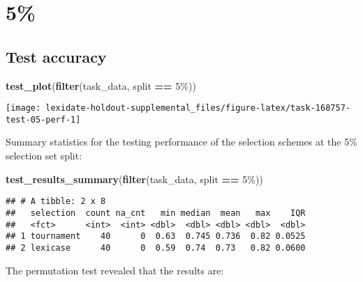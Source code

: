 \documentclass[
]{book}
\newenvironment{Shaded}{\begin{snugshade}}{\end{snugshade}}
\newcommand{\FunctionTok}[1]{\textcolor[rgb]{0.13,0.29,0.53}{\textbf{#1}}}
\newcommand{\NormalTok}[1]{#1}
\newcommand{\SpecialCharTok}[1]{\textcolor[rgb]{0.81,0.36,0.00}{\textbf{#1}}}
\newcommand{\StringTok}[1]{\textcolor[rgb]{0.31,0.60,0.02}{#1}}
\begin{document}
\hypertarget{section-20}{%
\section{5\%}\label{section-20}}

\hypertarget{test-accuracy-20}{%
\subsection{Test accuracy}\label{test-accuracy-20}}

\begin{Shaded}
\begin{Highlighting}[]
\FunctionTok{test\_plot}\NormalTok{(}\FunctionTok{filter}\NormalTok{(task\_data, split }\SpecialCharTok{==} \StringTok{\textquotesingle{}5\%\textquotesingle{}}\NormalTok{))}
\end{Highlighting}
\end{Shaded}

\texttt{[image: lexidate-holdout-supplemental\_files/figure-latex/task-168757-test-05-perf-1]}

Summary statistics for the testing performance of the selection schemes at the 5\% selection set split:

\begin{Shaded}
\begin{Highlighting}[]
\FunctionTok{test\_results\_summary}\NormalTok{(}\FunctionTok{filter}\NormalTok{(task\_data, split }\SpecialCharTok{==} \StringTok{\textquotesingle{}5\%\textquotesingle{}}\NormalTok{))}
\end{Highlighting}
\end{Shaded}

\begin{verbatim}
## # A tibble: 2 x 8
##   selection  count na_cnt   min median  mean   max    IQR
##   <fct>      <int>  <int> <dbl>  <dbl> <dbl> <dbl>  <dbl>
## 1 tournament    40      0  0.63  0.745 0.736  0.82 0.0525
## 2 lexicase      40      0  0.59  0.74  0.73   0.82 0.0600
\end{verbatim}

The permutation test revealed that the results are:
\end{document}

